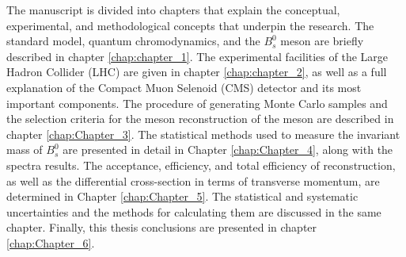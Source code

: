 The manuscript is divided into chapters that explain the conceptual, experimental, and methodological concepts that underpin the research. The standard model, quantum chromodynamics, and the $B^0_s$ meson are briefly described in chapter \ref{chap:chapter_1}. The experimental facilities of the Large Hadron Collider (LHC) are given in chapter \ref{chap:chapter_2}, as well as a full explanation of the Compact Muon Selenoid (CMS) detector and its most important components. The procedure of generating Monte Carlo samples and the selection criteria for the meson reconstruction of the meson are described in chapter \ref{chap:Chapter_3}. The statistical methods used to measure the invariant mass of $B^0_s$ are presented in detail in Chapter \ref{chap:Chapter_4}, along with the spectra results. The acceptance, efficiency, and total efficiency of reconstruction, as well as the differential cross-section in terms of transverse momentum, are determined in Chapter \ref{chap:Chapter_5}. The statistical and systematic uncertainties and the methods for calculating them are discussed in the same chapter. Finally, this thesis conclusions are presented in chapter \ref{chap:Chapter_6}. 